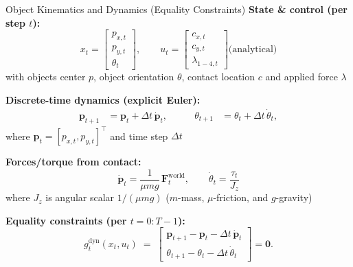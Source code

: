 \documentclass[10pt, aspectratio=169]{beamer}
\begin{document}
\begin{frame}{Object Kinematics and Dynamics (Equality Constraints)}
      \small 
      \textbf{State \& control (per step $t$):}
      \[
        x_t = \begin{bmatrix} p_{x,t} \\ p_{y,t} \\ \theta_t \end{bmatrix},
        \qquad
        u_t = \begin{bmatrix} c_{x,t} \\ c_{y,t} \\ \lambda_{1-4,t} \end{bmatrix}  \text{(analytical)}
      \]
      with objects center $p$, object orientation $\theta$, contact location $c$ and applied force $\lambda$ \medskip

      \textbf{Discrete-time dynamics (explicit Euler):}
      \[\begin{aligned}
          \mathbf{p}_{t+1} &= \mathbf{p}_t + \Delta t\,\dot{\mathbf{p}}_t,
          &\qquad
          \theta_{t+1} &= \theta_t + \Delta t\,\dot\theta_t,
        \end{aligned}\]
      where $\mathbf{p}_t=[p_{x,t},p_{y,t}]^\top$ and time step $\Delta t$\medskip

      \textbf{Forces/torque from contact:}
        \[
            \dot{\mathbf{p}}_t = \frac{1}{\mu m g}\,\mathbf{F}^{\text{world}}_t,
            \qquad
            \dot\theta_t = \frac{\tau_t}{J_z}
        \]
        where $J_z$ is angular scalar $1/(\mu m g)$ ($m$-mass, $\mu$-friction, and $g$-gravity) 

     \textbf{Equality constraints (per $t=0{:}T-1$):}
      \[
        g^{\text{dyn}}_t(x_t,u_t) \;=\;
        \begin{bmatrix}
          \mathbf{p}_{t+1} - \mathbf{p}_t - \Delta t\,\dot{\mathbf{p}}_t\\[0.2em]
          \theta_{t+1} - \theta_t - \Delta t\,\dot\theta_t
        \end{bmatrix} = \mathbf{0}.
      \]
\end{frame}
\end{document}
